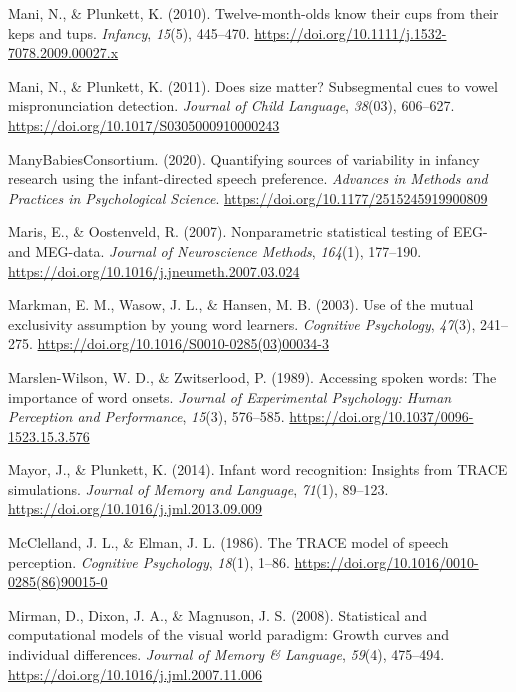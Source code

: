 \documentclass[
  english,
  man, noextraspace]{apa6}
\newlength{\cslhangindent}
\newenvironment{cslreferences}%
  {\setlength{\parindent}{0pt}%
  \everypar{\setlength{\hangindent}{\cslhangindent}}\ignorespaces}%
  {\par}
\begin{document}
\begin{cslreferences}
\leavevmode\hypertarget{ref-Mani2010kepstups}{}%
Mani, N., \& Plunkett, K. (2010). Twelve-month-olds know their cups from their keps and tups. \emph{Infancy}, \emph{15}(5), 445--470. \url{https://doi.org/10.1111/j.1532-7078.2009.00027.x}

\leavevmode\hypertarget{ref-Mani2011}{}%
Mani, N., \& Plunkett, K. (2011). Does size matter? Subsegmental cues to vowel mispronunciation detection. \emph{Journal of Child Language}, \emph{38}(03), 606--627. \url{https://doi.org/10.1017/S0305000910000243}

\leavevmode\hypertarget{ref-MB1}{}%
ManyBabiesConsortium. (2020). Quantifying sources of variability in infancy research using the infant-directed speech preference. \emph{Advances in Methods and Practices in Psychological Science}. \url{https://doi.org/10.1177/2515245919900809}

\leavevmode\hypertarget{ref-Maris2007}{}%
Maris, E., \& Oostenveld, R. (2007). Nonparametric statistical testing of EEG- and MEG-data. \emph{Journal of Neuroscience Methods}, \emph{164}(1), 177--190. \url{https://doi.org/10.1016/j.jneumeth.2007.03.024}

\leavevmode\hypertarget{ref-Markman2003}{}%
Markman, E. M., Wasow, J. L., \& Hansen, M. B. (2003). Use of the mutual exclusivity assumption by young word learners. \emph{Cognitive Psychology}, \emph{47}(3), 241--275. \url{https://doi.org/10.1016/S0010-0285(03)00034-3}

\leavevmode\hypertarget{ref-Marslen-Wilson1989}{}%
Marslen-Wilson, W. D., \& Zwitserlood, P. (1989). Accessing spoken words: The importance of word onsets. \emph{Journal of Experimental Psychology: Human Perception and Performance}, \emph{15}(3), 576--585. \url{https://doi.org/10.1037/0096-1523.15.3.576}

\leavevmode\hypertarget{ref-Mayor2014}{}%
Mayor, J., \& Plunkett, K. (2014). Infant word recognition: Insights from TRACE simulations. \emph{Journal of Memory and Language}, \emph{71}(1), 89--123. \url{https://doi.org/10.1016/j.jml.2013.09.009}

\leavevmode\hypertarget{ref-McClelland1986}{}%
McClelland, J. L., \& Elman, J. L. (1986). The TRACE model of speech perception. \emph{Cognitive Psychology}, \emph{18}(1), 1--86. \url{https://doi.org/10.1016/0010-0285(86)90015-0}

\leavevmode\hypertarget{ref-Mirman2008}{}%
Mirman, D., Dixon, J. A., \& Magnuson, J. S. (2008). Statistical and computational models of the visual world paradigm: Growth curves and individual differences. \emph{Journal of Memory \& Language}, \emph{59}(4), 475--494. \url{https://doi.org/10.1016/j.jml.2007.11.006}


\end{cslreferences}
\end{document}
